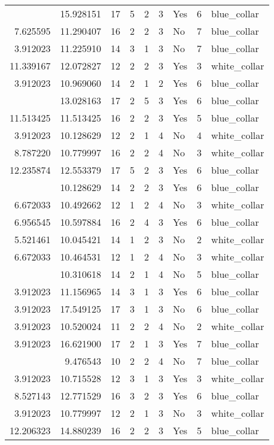 \documentclass[
]{article}
\begin{document}
\begin{longtable}[t]{rrrrrllrl}
\addlinespace
13.045590 & 15.928151 & 17 & 5 & 2 & 3 & Yes & 6 & blue\_collar\\
7.625595 & 11.290407 & 16 & 2 & 2 & 3 & No & 7 & blue\_collar\\
3.912023 & 11.225910 & 14 & 3 & 1 & 3 & No & 7 & blue\_collar\\
11.339167 & 12.072827 & 12 & 2 & 2 & 3 & Yes & 3 & white\_collar\\
3.912023 & 10.969060 & 14 & 2 & 1 & 2 & Yes & 6 & blue\_collar\\
\addlinespace
11.350995 & 13.028163 & 17 & 2 & 5 & 3 & Yes & 6 & blue\_collar\\
11.513425 & 11.513425 & 16 & 2 & 2 & 3 & Yes & 5 & blue\_collar\\
3.912023 & 10.128629 & 12 & 2 & 1 & 4 & No & 4 & white\_collar\\
8.787220 & 10.779997 & 16 & 2 & 2 & 4 & No & 3 & white\_collar\\
12.235874 & 12.553379 & 17 & 5 & 2 & 3 & Yes & 6 & blue\_collar\\
\addlinespace
4.605170 & 10.128629 & 14 & 2 & 2 & 3 & Yes & 6 & blue\_collar\\
6.672033 & 10.492662 & 12 & 1 & 2 & 4 & No & 3 & white\_collar\\
6.956545 & 10.597884 & 16 & 2 & 4 & 3 & Yes & 6 & blue\_collar\\
5.521461 & 10.045421 & 14 & 1 & 2 & 3 & No & 2 & white\_collar\\
6.672033 & 10.464531 & 12 & 1 & 2 & 4 & No & 3 & white\_collar\\
\addlinespace
3.912023 & 10.310618 & 14 & 2 & 1 & 4 & No & 5 & blue\_collar\\
3.912023 & 11.156965 & 14 & 3 & 1 & 3 & Yes & 6 & blue\_collar\\
3.912023 & 17.549125 & 17 & 3 & 1 & 3 & No & 6 & blue\_collar\\
3.912023 & 10.520024 & 11 & 2 & 2 & 4 & No & 2 & white\_collar\\
3.912023 & 16.621900 & 17 & 2 & 1 & 3 & Yes & 7 & blue\_collar\\
\addlinespace
4.382027 & 9.476543 & 10 & 2 & 2 & 4 & No & 7 & blue\_collar\\
3.912023 & 10.715528 & 12 & 3 & 1 & 3 & Yes & 3 & white\_collar\\
8.527143 & 12.771529 & 16 & 3 & 2 & 3 & Yes & 6 & blue\_collar\\
3.912023 & 10.779997 & 12 & 2 & 1 & 3 & No & 3 & white\_collar\\
12.206323 & 14.880239 & 16 & 2 & 2 & 3 & Yes & 5 & blue\_collar\\

\end{longtable}
\end{document}
